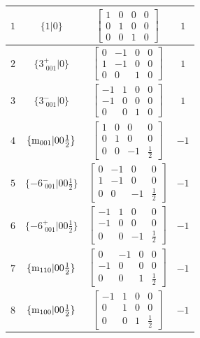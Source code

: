 \documentclass[fleqn,8pt]{jsarticle}
\begin{document}
\begin{longtable}{cccc}
$ 1 $ & $ \{1|0\} $ & $ \begin{bmatrix} 1 & 0 & 0 & 0 \\ 0 & 1 & 0 & 0 \\ 0 & 0 & 1 & 0 \end{bmatrix} $ & $ 1 $ \\ \hline
$ 2 $ & $ \{3^{+}_{\,\,001}|0\} $ & $ \begin{bmatrix} 0 & -1 & 0 & 0 \\ 1 & -1 & 0 & 0 \\ 0 & 0 & 1 & 0 \end{bmatrix} $ & $ 1 $ \\ \hline
$ 3 $ & $ \{3^{-}_{\,\,001}|0\} $ & $ \begin{bmatrix} -1 & 1 & 0 & 0 \\ -1 & 0 & 0 & 0 \\ 0 & 0 & 1 & 0 \end{bmatrix} $ & $ 1 $ \\ \hline
$ 4 $ & $ \{{\rm m}_{001}|0 0 \frac{1}{2}\} $ & $ \begin{bmatrix} 1 & 0 & 0 & 0 \\ 0 & 1 & 0 & 0 \\ 0 & 0 & -1 & \frac{1}{2} \end{bmatrix} $ & $ -1 $ \\ \hline
$ 5 $ & $ \{-6^{-}_{\,\,001}|0 0 \frac{1}{2}\} $ & $ \begin{bmatrix} 0 & -1 & 0 & 0 \\ 1 & -1 & 0 & 0 \\ 0 & 0 & -1 & \frac{1}{2} \end{bmatrix} $ & $ -1 $ \\ \hline
$ 6 $ & $ \{-6^{+}_{\,\,001}|0 0 \frac{1}{2}\} $ & $ \begin{bmatrix} -1 & 1 & 0 & 0 \\ -1 & 0 & 0 & 0 \\ 0 & 0 & -1 & \frac{1}{2} \end{bmatrix} $ & $ -1 $ \\ \hline
$ 7 $ & $ \{{\rm m}_{110}|0 0 \frac{1}{2}\} $ & $ \begin{bmatrix} 0 & -1 & 0 & 0 \\ -1 & 0 & 0 & 0 \\ 0 & 0 & 1 & \frac{1}{2} \end{bmatrix} $ & $ -1 $ \\ \hline
$ 8 $ & $ \{{\rm m}_{100}|0 0 \frac{1}{2}\} $ & $ \begin{bmatrix} -1 & 1 & 0 & 0 \\ 0 & 1 & 0 & 0 \\ 0 & 0 & 1 & \frac{1}{2} \end{bmatrix} $ & $ -1 $ \\ \hline

\end{longtable}
\end{document}
